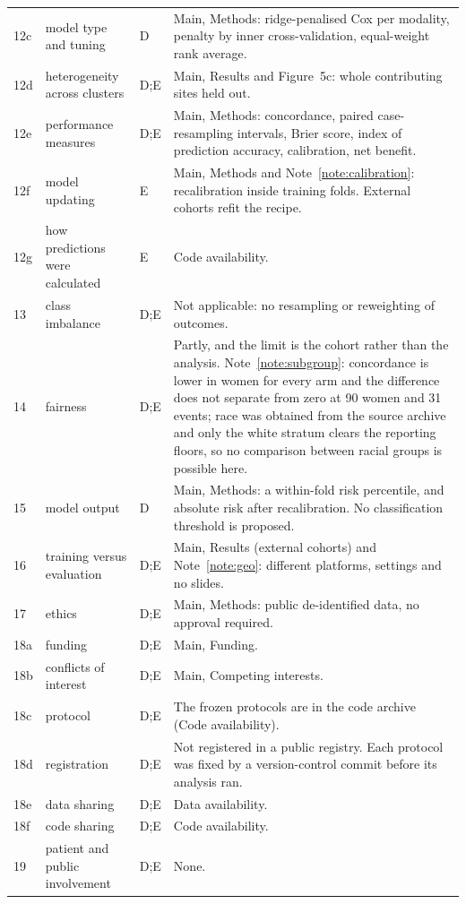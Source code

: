 \documentclass[11pt]{article}
\begin{document}
{\begin{longtable}{p{}p{}p{}p{}}
12c & model type and tuning & D & Main, Methods: ridge-penalised Cox per modality, penalty by inner cross-validation, equal-weight rank average. \\
12d & heterogeneity across clusters & D;E & Main, Results and Figure~5c: whole contributing sites held out. \\
12e & performance measures & D;E & Main, Methods: concordance, paired case-resampling intervals, Brier score, index of prediction accuracy, calibration, net benefit. \\
12f & model updating & E & Main, Methods and Note~\ref{note:calibration}: recalibration inside training folds. External cohorts refit the recipe. \\
12g & how predictions were calculated & E & Code availability. \\
13 & class imbalance & D;E & Not applicable: no resampling or reweighting of outcomes. \\
14 & fairness & D;E & Partly, and the limit is the cohort rather than the analysis. Note~\ref{note:subgroup}: concordance is lower in women for every arm and the difference does not separate from zero at 90 women and 31 events; race was obtained from the source archive and only the white stratum clears the reporting floors, so no comparison between racial groups is possible here. \\
15 & model output & D & Main, Methods: a within-fold risk percentile, and absolute risk after recalibration. No classification threshold is proposed. \\
16 & training versus evaluation & D;E & Main, Results (external cohorts) and Note~\ref{note:geo}: different platforms, settings and no slides. \\
17 & ethics & D;E & Main, Methods: public de-identified data, no approval required. \\
18a & funding & D;E & Main, Funding. \\
18b & conflicts of interest & D;E & Main, Competing interests. \\
18c & protocol & D;E & The frozen protocols are in the code archive (Code availability). \\
18d & registration & D;E & Not registered in a public registry. Each protocol was fixed by a version-control commit before its analysis ran. \\
18e & data sharing & D;E & Data availability. \\
18f & code sharing & D;E & Code availability. \\
19 & patient and public involvement & D;E & None. \\

\end{longtable}}
\end{document}

